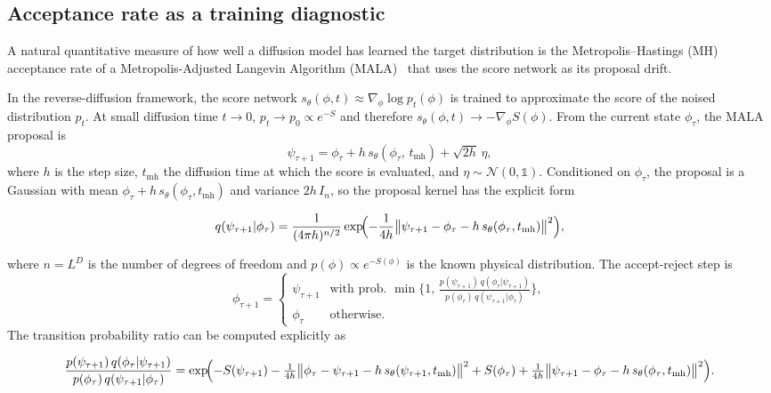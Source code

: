 \documentclass[reprint,twocolumn,superscriptaddress,preprintnumbers,amsmath,amssymb,aps,prd,floatfix]{revtex4-2}
\begin{document}
\subsection{Acceptance rate as a training diagnostic}
\label{sec:acceptance}

A natural quantitative measure of how well a diffusion model has learned the target distribution is the Metropolis--Hastings (MH) acceptance rate of a Metropolis-Adjusted Langevin Algorithm (MALA)~\cite{Roberts1998} that uses the score network as its proposal drift.

In the reverse-diffusion framework, the score network $s_\theta(\phi,t)\approx\nabla_\phi\log p_t(\phi)$ is trained to approximate the score of the noised distribution $p_t$. At small diffusion time $t\to 0$, $p_t\to p_0\propto e^{-S}$ and therefore $s_\theta(\phi,t)\to -\nabla_\phi S(\phi)$. From the current state $\phi_\tau$, the MALA proposal is
\begin{equation}
\psi_{\tau+1} = \phi_\tau + h\,s_\theta(\phi_\tau,\,t_{\text{mh}}) + \sqrt{2h}\,\eta,
\label{eq:mala_proposal}
\end{equation}
where $h$ is the step size, $t_{\text{mh}}$ the diffusion time at which the score is evaluated, and $\eta\sim\mathcal{N}(0,\mathds{1})$. Conditioned on $\phi_\tau$, the proposal is a Gaussian with mean $\phi_\tau + h\,s_\theta(\phi_\tau,t_{\text{mh}})$ and variance $2h\,I_n$, so the proposal kernel has the explicit form
\begin{widetext}
\begin{equation}
q(\psi_{\tau+1}|\phi_\tau) = \frac{1}{(4\pi h)^{n/2}}\exp\!\Bigl(-\frac{1}{4h}\bigl\|\psi_{\tau+1} - \phi_\tau - h\,s_\theta(\phi_\tau,t_{\text{mh}})\bigr\|^2\Bigr),
\label{eq:mala_kernel}
\end{equation}
\end{widetext}
where $n=L^D$ is the number of degrees of freedom and $p(\phi)\propto e^{-S(\phi)}$ is the known physical distribution. The accept-reject step is
\begin{equation}
\phi_{\tau+1} =
\begin{cases}
\psi_{\tau+1} & \text{with prob. } \min\!\bigl\{1,\,\tfrac{p(\psi_{\tau+1})\,q(\phi_\tau|\psi_{\tau+1})}{p(\phi_\tau)\,q(\psi_{\tau+1}|\phi_\tau)}\bigr\}, \\[6pt]
\phi_\tau      & \text{otherwise}.
\end{cases}
\label{eq:mala_accept}
\end{equation}
The transition probability ratio can be computed explicitly as
\begin{widetext}
\begin{equation}
\frac{p(\psi_{\tau+1})\,q(\phi_\tau|\psi_{\tau+1})}{p(\phi_\tau)\,q(\psi_{\tau+1}|\phi_\tau)}
= \exp\!\Bigl(
  -S(\psi_{\tau+1}) - \tfrac{1}{4h}\bigl\|\phi_\tau - \psi_{\tau+1} - h\,s_\theta(\psi_{\tau+1},t_{\text{mh}})\bigr\|^2
 + S(\phi_\tau) + \tfrac{1}{4h}\bigl\|\psi_{\tau+1} - \phi_\tau - h\,s_\theta(\phi_\tau,t_{\text{mh}})\bigr\|^2
\Bigr).
\label{eq:mala_ratio}
\end{equation}
\end{widetext}
\end{document}
